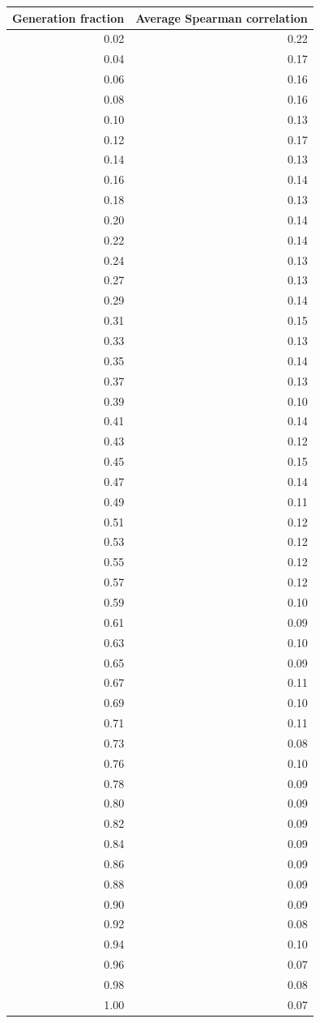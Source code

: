 \begin{tabular}{rr}
\toprule
Generation fraction & Average Spearman correlation \\
\midrule
0.02 & 0.22 \\
0.04 & 0.17 \\
0.06 & 0.16 \\
0.08 & 0.16 \\
0.10 & 0.13 \\
0.12 & 0.17 \\
0.14 & 0.13 \\
0.16 & 0.14 \\
0.18 & 0.13 \\
0.20 & 0.14 \\
0.22 & 0.14 \\
0.24 & 0.13 \\
0.27 & 0.13 \\
0.29 & 0.14 \\
0.31 & 0.15 \\
0.33 & 0.13 \\
0.35 & 0.14 \\
0.37 & 0.13 \\
0.39 & 0.10 \\
0.41 & 0.14 \\
0.43 & 0.12 \\
0.45 & 0.15 \\
0.47 & 0.14 \\
0.49 & 0.11 \\
0.51 & 0.12 \\
0.53 & 0.12 \\
0.55 & 0.12 \\
0.57 & 0.12 \\
0.59 & 0.10 \\
0.61 & 0.09 \\
0.63 & 0.10 \\
0.65 & 0.09 \\
0.67 & 0.11 \\
0.69 & 0.10 \\
0.71 & 0.11 \\
0.73 & 0.08 \\
0.76 & 0.10 \\
0.78 & 0.09 \\
0.80 & 0.09 \\
0.82 & 0.09 \\
0.84 & 0.09 \\
0.86 & 0.09 \\
0.88 & 0.09 \\
0.90 & 0.09 \\
0.92 & 0.08 \\
0.94 & 0.10 \\
0.96 & 0.07 \\
0.98 & 0.08 \\
1.00 & 0.07 \\
\bottomrule
\end{tabular}

